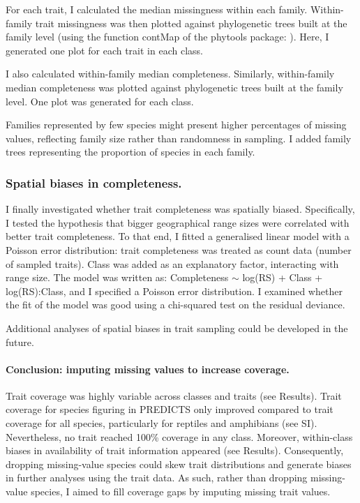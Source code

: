 For each trait, I calculated the median missingness within each family. Within-family trait missingness was then plotted against phylogenetic trees built at the family level (using the function contMap of the phytools package: \citet{Revell2016}). Here, I generated one plot for each trait in each class.

I also calculated within-family median completeness. Similarly, within-family median completeness was plotted against phylogenetic trees built at the family level. One plot was generated for each class.

Families represented by few species might present higher percentages of missing values, reflecting family size rather than randomness in sampling. I added family trees representing the proportion of species in each family. 

\subsubsection{Spatial biases in completeness.} I finally investigated whether trait completeness was spatially biased. Specifically, I tested the hypothesis that bigger geographical range sizes were correlated with better trait completeness. To that end, I fitted a generalised linear model with a Poisson error distribution: trait completeness was treated as count data (number of sampled traits). Class was added as an explanatory factor, interacting with range size. The model was written as: Completeness $\sim$ log(RS) + Class + log(RS):Class, and I specified a Poisson error distribution. I examined whether the fit of the model was good using a chi-squared test on the residual deviance.

Additional analyses of spatial biases in trait sampling could be developed in the future.



\paragraph{Conclusion: imputing missing values to increase coverage.}
Trait coverage was highly variable across classes and traits (see Results). Trait coverage for species figuring in PREDICTS only improved compared to trait coverage for all species, particularly for reptiles and amphibians (see SI). Nevertheless, no trait reached 100\% coverage in any class. Moreover, within-class biases in availability of trait information appeared (see Results). Consequently, dropping missing-value species could skew trait distributions and generate biases in further analyses using the trait data. As such, rather than dropping missing-value species, I aimed to fill coverage gaps by imputing missing trait values. 

